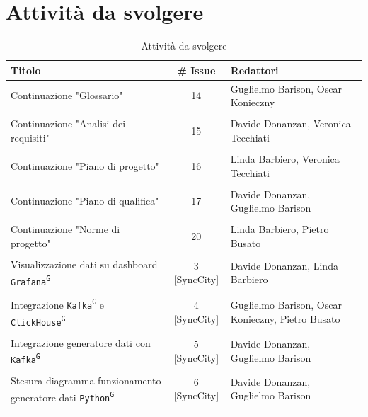 \documentclass[8pt]{article}
\newcommand{\glossterm}[1]{#1\textsuperscript{G}} %
\begin{document}
\section{Attività da svolgere}
\begin{table}[ht!]
	\centering
	\begin{tabular}{p{7cm}cp{7cm}}
		\toprule
		\textbf{Titolo} & \textbf{\# Issue} & \textbf{Redattori} \\
		\midrule
		Continuazione "Glossario" & 14 & Guglielmo Barison, Oscar Konieczny\\\\
		Continuazione "Analisi dei requisiti" & 15 & Davide Donanzan, Veronica Tecchiati\\\\
		Continuazione "Piano di progetto"  & 16 & Linda Barbiero, Veronica Tecchiati\\\\
		Continuazione "Piano di qualifica" & 17 & Davide Donanzan, Guglielmo Barison\\\\
		Continuazione "Norme di progetto" & 20 & Linda Barbiero, Pietro Busato\\\\
		Visualizzazione dati su dashboard \texttt{\glossterm{Grafana}} & 3 [SyncCity] & Davide Donanzan, Linda Barbiero\\\\
		Integrazione \texttt{\glossterm{Kafka}} e \texttt{\glossterm{ClickHouse}} & 4 [SyncCity] & Guglielmo Barison, Oscar Konieczny, Pietro Busato\\\\
		Integrazione generatore dati con \texttt{\texttt{\glossterm{Kafka}}} & 5 [SyncCity] & Davide Donanzan, Guglielmo Barison\\\\
		Stesura diagramma funzionamento generatore dati \texttt{\glossterm{Python}} & 6 [SyncCity] & Davide Donanzan, Guglielmo Barison\\\\
		\bottomrule
	\end{tabular}
	\caption{Attività da svolgere}
	\label{table:Attivita da svolgere}
\end{table}
\end{document}
